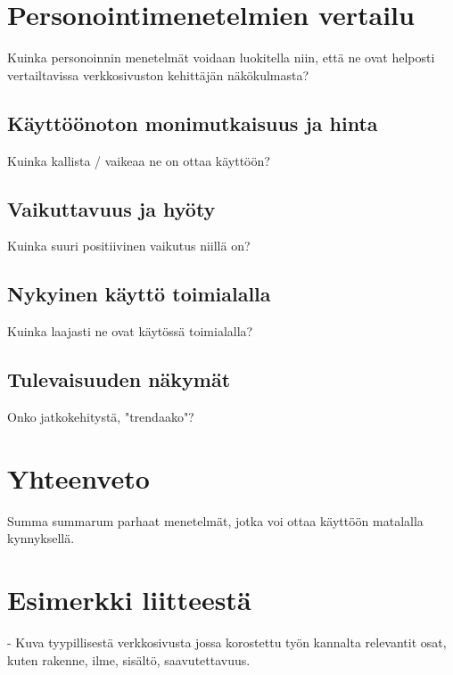 \documentclass[finnish, 12pt, a4paper, elec, utf8, a-1b, online]{aaltothesis}
\begin{document}
\clearpage

\section{Personointimenetelmien vertailu}

Kuinka personoinnin menetelmät voidaan luokitella niin, että ne ovat helposti
vertailtavissa verkkosivuston kehittäjän näkökulmasta?

\subsection{Käyttöönoton monimutkaisuus ja hinta}

Kuinka kallista / vaikeaa ne on ottaa käyttöön?

\subsection{Vaikuttavuus ja hyöty}

Kuinka suuri positiivinen vaikutus niillä on?

\subsection{Nykyinen käyttö toimialalla}

Kuinka laajasti ne ovat käytössä toimialalla?

\subsection{Tulevaisuuden näkymät}

Onko jatkokehitystä, "trendaako"?

\clearpage

\section{Yhteenveto}

Summa summarum parhaat menetelmät, jotka voi ottaa käyttöön matalalla
kynnyksellä.

\clearpage

\thesisbibliography{}
\printbibliography{}

\clearpage
\thesisappendix{}

\section{Esimerkki liitteestä\label{LiiteA}}

- Kuva tyypillisestä verkkosivusta jossa korostettu työn kannalta relevantit
osat, kuten rakenne, ilme, sisältö, saavutettavuus.
\end{document}
